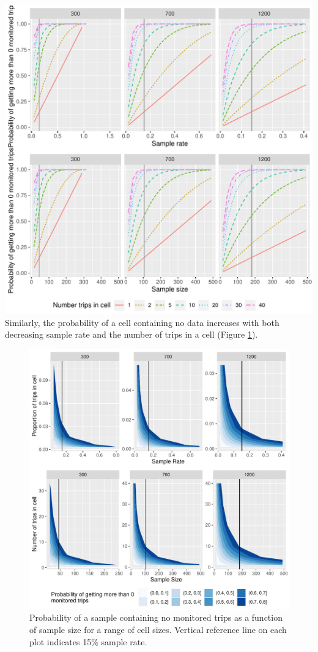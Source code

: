 \documentclass[
]{article}
\begin{document}
\includegraphics{images/gg-prob0-line-plts-1.pdf}
Similarly, the probability of a cell containing no data increases with both
decreasing sample rate and the number of trips in a cell (Figure
\ref{fig:gg-prob0-contour-plts}).

\begin{figure}
\centering
\includegraphics{images/gg-prob0-contour-plts-1.pdf}
\caption{\label{fig:gg-prob0-contour-plts}Probability of a sample containing no monitored trips as a function of sample size for a range of cell sizes. Vertical reference line on each plot indicates 15\% sample rate.}
\end{figure}
\end{document}
